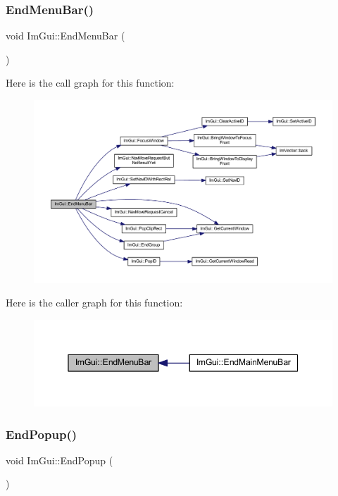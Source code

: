 \subsubsection{\texorpdfstring{End\+Menu\+Bar()}{EndMenuBar()}}
{\footnotesize\ttfamily void Im\+Gui\+::\+End\+Menu\+Bar (\begin{DoxyParamCaption}{ }\end{DoxyParamCaption})}

Here is the call graph for this function\+:
\nopagebreak
\begin{figure}[H]
\begin{center}
\leavevmode
\includegraphics[width=350pt]{namespace_im_gui_aa226265c140eb6ee375c5b9abc69c4fc_cgraph}
\end{center}
\end{figure}
Here is the caller graph for this function\+:
\nopagebreak
\begin{figure}[H]
\begin{center}
\leavevmode
\includegraphics[width=345pt]{namespace_im_gui_aa226265c140eb6ee375c5b9abc69c4fc_icgraph}
\end{center}
\end{figure}
\mbox{\label{namespace_im_gui_aa6a9b5696f2ea7eed7683425fc77b8f2}} 
\subsubsection{\texorpdfstring{End\+Popup()}{EndPopup()}}
{\footnotesize\ttfamily void Im\+Gui\+::\+End\+Popup (\begin{DoxyParamCaption}{ }\end{DoxyParamCaption})}

